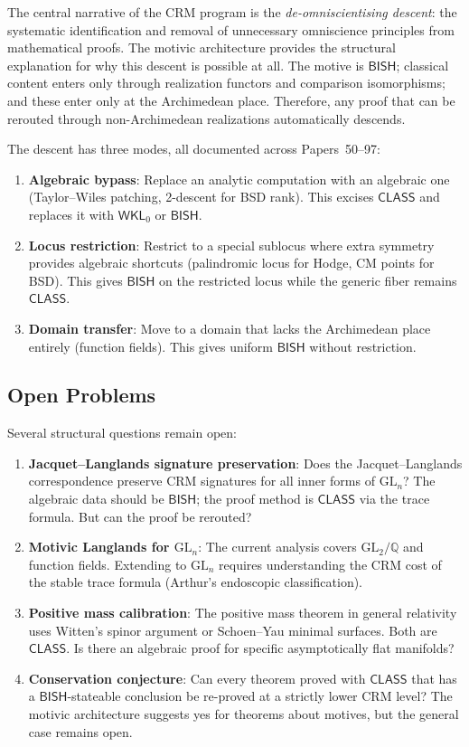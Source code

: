 \documentclass[11pt,a4paper]{article}
\theoremstyle{plain}
\theoremstyle{definition}
\newcommand{\BISH}{\textsf{BISH}}
\newcommand{\WKL}{\textsf{WKL}_0}
\newcommand{\CLASS}{\textsf{CLASS}}
\newcommand{\Q}{\mathbb{Q}}
\newcommand{\GL}{\mathrm{GL}}
\begin{document}
The central narrative of the CRM program is the \emph{de-omniscientising descent}: the systematic identification and removal of unnecessary omniscience principles from mathematical proofs. The motivic architecture provides the structural explanation for why this descent is possible at all. The motive is $\BISH$; classical content enters only through realization functors and comparison isomorphisms; and these enter only at the Archimedean place. Therefore, any proof that can be rerouted through non-Archimedean realizations automatically descends.

The descent has three modes, all documented across Papers~50--97:
\begin{enumerate}[label=(\roman*)]
\item \textbf{Algebraic bypass}: Replace an analytic computation with an algebraic one (Taylor--Wiles patching, 2-descent for BSD rank). This excises $\CLASS$ and replaces it with $\WKL$ or $\BISH$.
\item \textbf{Locus restriction}: Restrict to a special sublocus where extra symmetry provides algebraic shortcuts (palindromic locus for Hodge, CM points for BSD). This gives $\BISH$ on the restricted locus while the generic fiber remains $\CLASS$.
\item \textbf{Domain transfer}: Move to a domain that lacks the Archimedean place entirely (function fields). This gives uniform $\BISH$ without restriction.
\end{enumerate}

\subsection{Open Problems}

Several structural questions remain open:
\begin{enumerate}[label=(\arabic*)]
\item \textbf{Jacquet--Langlands signature preservation}: Does the Jacquet--Langlands correspondence preserve CRM signatures for all inner forms of $\GL_n$? The algebraic data should be $\BISH$; the proof method is $\CLASS$ via the trace formula. But can the proof be rerouted?
\item \textbf{Motivic Langlands for $\GL_n$}: The current analysis covers $\GL_2/\Q$ and function fields. Extending to $\GL_n$ requires understanding the CRM cost of the stable trace formula (Arthur's endoscopic classification).
\item \textbf{Positive mass calibration}: The positive mass theorem in general relativity uses Witten's spinor argument or Schoen--Yau minimal surfaces. Both are $\CLASS$. Is there an algebraic proof for specific asymptotically flat manifolds?
\item \textbf{Conservation conjecture}: Can every theorem proved with $\CLASS$ that has a $\BISH$-stateable conclusion be re-proved at a strictly lower CRM level? The motivic architecture suggests yes for theorems about motives, but the general case remains open.
\end{enumerate}
\end{document}
